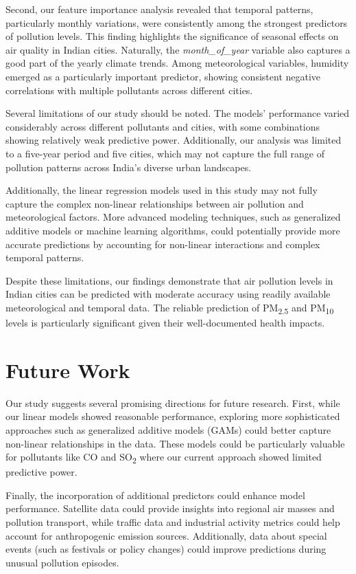 \documentclass[twoside,11pt]{article}
\begin{document}
Second, our feature importance analysis revealed that temporal patterns, particularly monthly variations, were consistently among the strongest predictors of pollution levels. This finding highlights the significance of seasonal effects on air quality in Indian cities. Naturally, the \textit{month\_of\_year} variable also captures a good part of the yearly climate trends. Among meteorological variables, humidity emerged as a particularly important predictor, showing consistent negative correlations with multiple pollutants across different cities.

Several limitations of our study should be noted. The models' performance varied considerably across different pollutants and cities, with some combinations showing relatively weak predictive power. Additionally, our analysis was limited to a five-year period and five cities, which may not capture the full range of pollution patterns across India's diverse urban landscapes.

Additionally, the linear regression models used in this study may not fully capture the complex non-linear relationships between air pollution and meteorological factors. More advanced modeling techniques, such as generalized additive models or machine learning algorithms, could potentially provide more accurate predictions by accounting for non-linear interactions and complex temporal patterns.

Despite these limitations, our findings demonstrate that air pollution levels in Indian cities can be predicted with moderate accuracy using readily available meteorological and temporal data. The reliable prediction of PM\textsubscript{2.5} and PM\textsubscript{10} levels is particularly significant given their well-documented health impacts.


\section{Future Work}

Our study suggests several promising directions for future research. First, while our linear models showed reasonable performance, exploring more sophisticated approaches such as generalized additive models (GAMs) could better capture non-linear relationships in the data. These models could be particularly valuable for pollutants like CO and SO\textsubscript{2} where our current approach showed limited predictive power.

Finally, the incorporation of additional predictors could enhance model performance. Satellite data could provide insights into regional air masses and pollution transport, while traffic data and industrial activity metrics could help account for anthropogenic emission sources. Additionally, data about special events (such as festivals or policy changes) could improve predictions during unusual pollution episodes.
\end{document}
